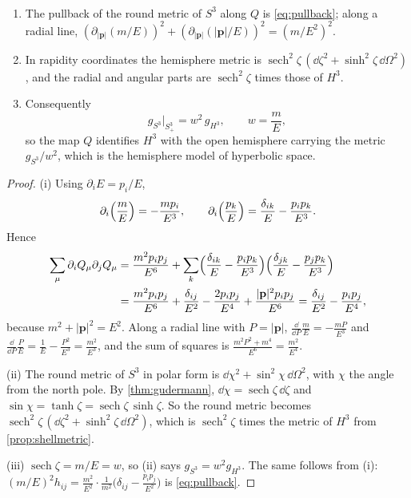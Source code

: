 \begin{theorem}\label{thm:hemiconformal}\ver\
\begin{enumerate}[label=(\roman*)]
\item The pullback of the round metric of $S^3$ along $Q$ is \eqref{eq:pullback}; along a radial line, $(\partial_{|\mathbf p|}(m/E))^2+(\partial_{|\mathbf p|}(|\mathbf p|/E))^2=(m/E^2)^2$.
\item In rapidity coordinates the hemisphere metric is $\operatorname{sech}^2\zeta\,(\dd\zeta^2+\sinh^2\zeta\,\dd\Omega^2)$, and the radial and angular parts are $\operatorname{sech}^2\zeta$ times those of $H^3$.
\item Consequently
\[
g_{S^3}\big|_{S^3_+}=w^2\,g_{H^3},\qquad w=\frac mE ,
\]
so the map $Q$ identifies $H^3$ with the open hemisphere carrying the metric $g_{S^3}/w^2$, which is the hemisphere model of hyperbolic space.
\end{enumerate}
\end{theorem}
\begin{proof}
(i) Using $\partial_iE=p_i/E$,
\[
\partial_i\Bigl(\frac mE\Bigr)=-\frac{mp_i}{E^3},\qquad \partial_i\Bigl(\frac{p_k}E\Bigr)=\frac{\delta_{ik}}E-\frac{p_ip_k}{E^3}.
\]
Hence
\begin{align*}
\sum_\mu\partial_iQ_\mu\partial_jQ_\mu&=\frac{m^2p_ip_j}{E^6}+\sum_k\Bigl(\frac{\delta_{ik}}E-\frac{p_ip_k}{E^3}\Bigr)\Bigl(\frac{\delta_{jk}}E-\frac{p_jp_k}{E^3}\Bigr)\\
&=\frac{m^2p_ip_j}{E^6}+\frac{\delta_{ij}}{E^2}-\frac{2p_ip_j}{E^4}+\frac{|\mathbf p|^2p_ip_j}{E^6}
=\frac{\delta_{ij}}{E^2}-\frac{p_ip_j}{E^4},
\end{align*}
because $m^2+|\mathbf p|^2=E^2$. Along a radial line with $P=|\mathbf p|$, $\frac{\dd}{\dd P}\frac mE=-\frac{mP}{E^3}$ and $\frac{\dd}{\dd P}\frac PE=\frac1E-\frac{P^2}{E^3}=\frac{m^2}{E^3}$, and the sum of squares is $\frac{m^2P^2+m^4}{E^6}=\frac{m^2}{E^4}$.

(ii) The round metric of $S^3$ in polar form is $\dd\chi^2+\sin^2\chi\,\dd\Omega^2$, with $\chi$ the angle from the north pole. By \cref{thm:gudermann}, $\dd\chi=\operatorname{sech}\zeta\,\dd\zeta$ and $\sin\chi=\tanh\zeta=\operatorname{sech}\zeta\,\sinh\zeta$. So the round metric becomes $\operatorname{sech}^2\zeta\,(\dd\zeta^2+\sinh^2\zeta\,\dd\Omega^2)$, which is $\operatorname{sech}^2\zeta$ times the metric of $H^3$ from \cref{prop:shellmetric}.

(iii) $\operatorname{sech}\zeta=m/E=w$, so (ii) says $g_{S^3}=w^2g_{H^3}$. The same follows from (i): $(m/E)^2h_{ij}=\frac{m^2}{E^2}\cdot\frac1{m^2}\bigl(\delta_{ij}-\frac{p_ip_j}{E^2}\bigr)$ is \eqref{eq:pullback}.
\end{proof}


